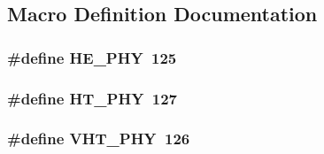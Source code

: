 \subsection{Macro Definition Documentation}
\subsubsection[{\texorpdfstring{H\+E\+\_\+\+P\+HY}{HE_PHY}}]{\setlength{\rightskip}{0pt plus 5cm}\#define H\+E\+\_\+\+P\+HY~125}\hypertarget{wifi-phy_8h_a4d8ba0c6033ee667a5145799b36facec}{}\label{wifi-phy_8h_a4d8ba0c6033ee667a5145799b36facec}
\subsubsection[{\texorpdfstring{H\+T\+\_\+\+P\+HY}{HT_PHY}}]{\setlength{\rightskip}{0pt plus 5cm}\#define H\+T\+\_\+\+P\+HY~127}\hypertarget{wifi-phy_8h_aa14582218f55eb2528494e9d2da6da5e}{}\label{wifi-phy_8h_aa14582218f55eb2528494e9d2da6da5e}
\subsubsection[{\texorpdfstring{V\+H\+T\+\_\+\+P\+HY}{VHT_PHY}}]{\setlength{\rightskip}{0pt plus 5cm}\#define V\+H\+T\+\_\+\+P\+HY~126}\hypertarget{wifi-phy_8h_aa9033bc77b3ccafb06e343442bf31e13}{}\label{wifi-phy_8h_aa9033bc77b3ccafb06e343442bf31e13}
